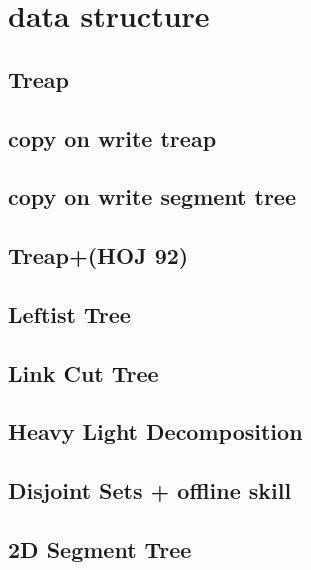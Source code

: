 \documentclass[12pt,twocolumn,oneside,a4paper]{article}
\begin{document}
\section{data structure}
\subsection{Treap}


\subsection{copy on write treap}


\subsection{copy on write segment tree}


\subsection{Treap+(HOJ 92)}


\subsection{Leftist Tree}


\subsection{Link Cut Tree}


\subsection{Heavy Light Decomposition}


\subsection{Disjoint Sets + offline skill}


\subsection{2D Segment Tree}

\end{document}
